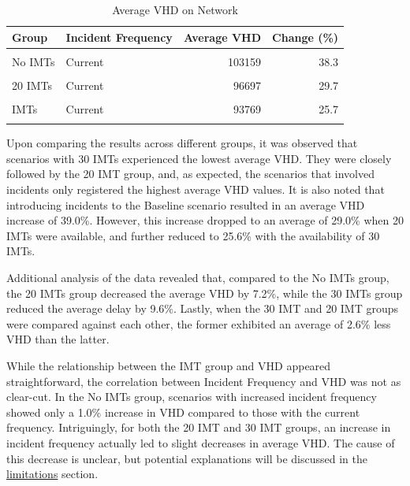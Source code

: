 \documentclass[fancy, oneside, mastersfancy, ms]{byuthesis}
\begin{document}
\hypertarget{tbl-network-delays-table}{}
\begin{table}
\caption{\label{tbl-network-delays-table}Average VHD on Network }\tabularnewline

\centering
\begin{tabular}[t]{llrr}
\toprule
\textbf{Group} & \textbf{Incident Frequency} & \textbf{Average VHD} & \textbf{Change (\%)}\\
\midrule
\cellcolor{gray!6}{Baseline} & \cellcolor{gray!6}{-} & \cellcolor{gray!6}{74568} & \cellcolor{gray!6}{0.0}\\
No IMTs & Current & 103159 & 38.3\\
\cellcolor{gray!6}{No IMTs} & \cellcolor{gray!6}{Increased} & \cellcolor{gray!6}{104178} & \cellcolor{gray!6}{39.7}\\
20 IMTs & Current & 96697 & 29.7\\
\cellcolor{gray!6}{20 IMTs} & \cellcolor{gray!6}{Increased} & \cellcolor{gray!6}{95678} & \cellcolor{gray!6}{28.3}\\
\addlinespace
30 IMTs & Current & 93769 & 25.7\\
\cellcolor{gray!6}{30 IMTs} & \cellcolor{gray!6}{Increased} & \cellcolor{gray!6}{93560} & \cellcolor{gray!6}{25.5}\\
\bottomrule
\end{tabular}
\end{table}

Upon comparing the results across different groups, it was observed that
scenarios with 30 IMTs experienced the lowest average VHD. They were
closely followed by the 20 IMT group, and, as expected, the scenarios
that involved incidents only registered the highest average VHD values.
It is also noted that introducing incidents to the Baseline scenario
resulted in an average VHD increase of 39.0\%. However, this increase
dropped to an average of 29.0\% when 20 IMTs were available, and further
reduced to 25.6\% with the availability of 30 IMTs.

Additional analysis of the data revealed that, compared to the No IMTs
group, the 20 IMTs group decreased the average VHD by 7.2\%, while the
30 IMTs group reduced the average delay by 9.6\%. Lastly, when the 30
IMT and 20 IMT groups were compared against each other, the former
exhibited an average of 2.6\% less VHD than the latter.

While the relationship between the IMT group and VHD appeared
straightforward, the correlation between Incident Frequency and VHD was
not as clear-cut. In the No IMTs group, scenarios with increased
incident frequency showed only a 1.0\% increase in VHD compared to those
with the current frequency. Intriguingly, for both the 20 IMT and 30 IMT
groups, an increase in incident frequency actually led to slight
decreases in average VHD. The cause of this decrease is unclear, but
potential explanations will be discussed in the
\protect\hyperlink{sec-limitations}{limitations} section.
\end{document}
